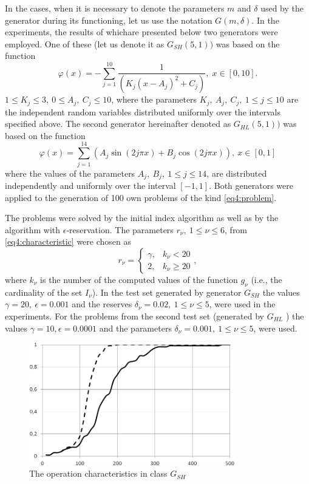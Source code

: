 In the cases, when it is necessary to denote the parameters $m$ and $\delta$ used by the generator during its functioning, let us use the notation $G ( m , \delta )$. In the experiments, the results of whichare presented below two generators were employed. One of these (let us denote it as $G_{SH} ( 5 , 1 ) )$ was based on the function
\begin{displaymath}
  \varphi(x)=-\sum_{j=1}^{10}\frac{1}{(K_j(x-A_j)^2+C_j)},\; x\in[0,10].
\end{displaymath}
$1\le K_j\le 3,\: 0\le A_j,\: C_j\le 10 $, where the parameters $K_j,\: A_j,\: C_j ,\: 1 \le j \le 10$ are the independent random variables distributed uniformly over the intervals specified above. The second generator hereinafter denoted as $G_{HL} ( 5 , 1 ) )$ was based on the function
\begin{equation}
  \varphi(x)=\sum_{j=1}^{14}(A_j\sin(2j\pi x) + B_j\cos(2j\pi x)),\: x\in[0,1]
\end{equation}
where the values of the parameters $A_j,\: B_j,\: 1 \le j \le 14$, are distributed independently and uniformly over the interval $[-1 ,1 ]$. Both generators were applied to the generation of 100 own
problems of the kind \eqref{eq4:problem}.

The problems were solved by the initial index algorithm as well as by the algorithm with $\epsilon$-reservation. The parameters $r_\nu ,\: 1 \le \nu \le 6$, from \eqref{eq4:characteristic} were chosen as
\begin{displaymath}
  r_\nu = \left\{
  \begin{array}{lr}
    \gamma, & k_\nu < 20\\
    2, & k_\nu \ge 20
  \end{array}
  \right.,
\end{displaymath}
where $k_\nu$ is the number of the computed values of the function $g_\nu$ (i.e., the cardinality of the set $I_\nu$). In the test set generated by generator $G_{SH}$ the values $\gamma=20,\: \epsilon = 0.001$ and the reserves $\delta_\nu=0.02,\: 1 \le \nu \le 5$, were used in the experiments. For the problems from the second test set
(generated by $G_{HL}$ ) the values $\gamma = 10, \epsilon=0.0001$ and the parameters $\delta_\nu=0.001,\: 1 \le \nu\le 5$, were used.

\begin{figure}[ht]
  \centering
  \includegraphics[width=0.8\textwidth]{figures/4_9.png}
  \caption{The operation characteristics in class $G_{SH}$}
  \label{fig:4_9}
\end{figure}

